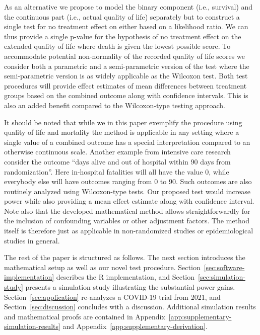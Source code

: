 As an alternative we propose to model the binary component (i.e., survival) and the continuous part (i.e., actual quality of life) separately but to construct a single test for no treatment effect on either based on a likelihood ratio. We can thus provide a single p-value for the hypothesis of no treatment effect on the extended quality of life where death is given the lowest possible score. To accommodate potential non-normality of the recorded quality of life scores we consider both a parametric and a semi-parametric version of the test where the semi-parametric version is as widely applicable as the Wilcoxon test. Both test procedures will provide effect estimates of mean differences between treatment groups based on the combined outcome along with confidence intervals. This is also an added benefit compared to the Wilcoxon-type testing approach.

It should be noted that while we in this paper exemplify the procedure using quality of life and mortality the method is applicable in any setting where a single value of a combined outcome has a special interpretation compared to an otherwise continuous scale. Another example from intensive care research consider the outcome ``days alive and out of hospital within 90 days from randomization''. Here in-hospital fatalities will all have the value 0, while everybody else will have outcomes ranging from 0 to 90. Such outcomes are also routinely analyzed using Wilcoxon-type tests. Our proposed test would increase power while also providing a mean effect estimate along with confidence interval. Note also that the developed mathematical method allows straightforwardly for the inclusion of confounding variables or other adjustment factors. The method itself is therefore just as applicable in non-randomized studies or epidemiological studies in general.

The rest of the paper is structured as follows. The next section introduces the mathematical setup as well as our novel test procedure. Section~\ref{sec:software-implementation} describes the R implementation, and Section~\ref{sec:simulation-study} presents a simulation study illustrating the substantial power gains. Section~\ref{sec:application} re-analyzes a COVID-19 trial from 2021, and Section~\ref{sec:discussion} concludes with a discussion. Additional simulation results and mathematical proofs are contained in Appendix~\ref{app:supplementary-simulation-results} and Appendix~\ref{app:supplementary-derivation}.
